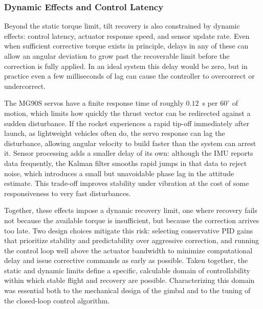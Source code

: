 \subsubsection{Dynamic Effects and Control Latency}
\label{subsubsec:latency}

Beyond the static torque limit, tilt recovery is also constrained by dynamic effects: control latency, actuator response speed, and sensor update rate. Even when sufficient corrective torque exists in principle, delays in any of these can allow an angular deviation to grow past the recoverable limit before the correction is fully applied. In an ideal system this delay would be zero, but in practice even a few milliseconds of lag can cause the controller to overcorrect or undercorrect.

The MG90S servos have a finite response time of roughly $0.12$~s per $60^\circ$ of motion, which limits how quickly the thrust vector can be redirected against a sudden disturbance. If the rocket experiences a rapid tip-off immediately after launch, as lightweight vehicles often do, the servo response can lag the disturbance, allowing angular velocity to build faster than the system can arrest it. Sensor processing adds a smaller delay of its own: although the IMU reports data frequently, the Kalman filter smooths rapid jumps in that data to reject noise, which introduces a small but unavoidable phase lag in the attitude estimate. This trade-off improves stability under vibration at the cost of some responsiveness to very fast disturbances.

Together, these effects impose a dynamic recovery limit, one where recovery fails not because the available torque is insufficient, but because the correction arrives too late. Two design choices mitigate this risk: selecting conservative PID gains that prioritize stability and predictability over aggressive correction, and running the control loop well above the actuator bandwidth to minimize computational delay and issue corrective commands as early as possible. Taken together, the static and dynamic limits define a specific, calculable domain of controllability within which stable flight and recovery are possible. Characterizing this domain was essential both to the mechanical design of the gimbal and to the tuning of the closed-loop control algorithm.